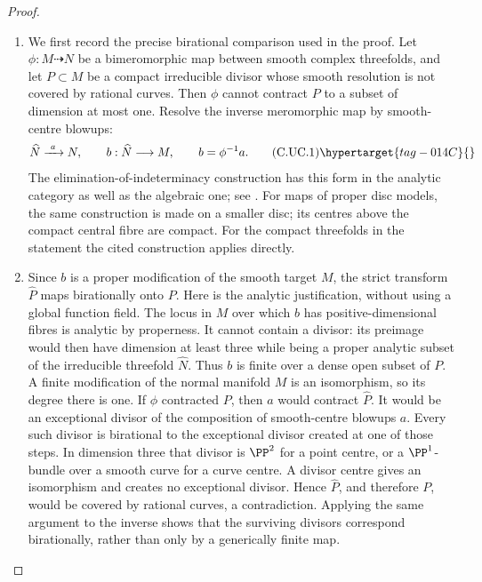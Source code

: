 \begin{proof}

\begin{enumerate}[label={$\langle1\rangle$\arabic*.},leftmargin=*]
\item We first record the precise birational comparison
used in the proof. Let $\phi:M\dashrightarrow N$
be a bimeromorphic map between smooth complex
threefolds, and let $P\subset M$ be a compact
irreducible divisor whose smooth resolution is
not covered by rational curves. Then $\phi$
cannot contract $P$ to a subset of dimension
at most one. Resolve the inverse meromorphic
map by smooth-centre blowups:
\[
 \widehat N\xrightarrow{\ a\ }N,
 \qquad b:\widehat N\longrightarrow M,
 \qquad b=\phi^{-1}a.
\tag{C.UC.1}\hypertarget{tag-014C}{}\label{cdp:eq:C.UC.1}
\]
The elimination-of-indeterminacy construction
has this form in the analytic category as
well as the algebraic one; see
\cite[Section~1.2.4 and Lemma~1.3.1]{AKMW2002}.
For maps of proper disc models, the same
construction is made on a smaller disc; its
centres above the compact central fibre are
compact. For the compact threefolds in the
statement the cited construction applies
directly.

\item Since $b$ is a proper modification of the
smooth target $M$, the strict transform
$\widehat P$ maps birationally onto $P$.
Here is the analytic justification, without
using a global function field. The locus in
$M$ over which $b$ has positive-dimensional
fibres is analytic by properness. It cannot
contain a divisor: its preimage would then
have dimension at least three while being
a proper analytic subset of the irreducible
threefold $\widehat N$. Thus $b$ is finite
over a dense open subset of $P$. A finite
modification of the normal manifold $M$
is an isomorphism, so its degree there is
one. If $\phi$ contracted
$P$, then $a$ would contract $\widehat P$.
It would be an exceptional divisor of the
composition of smooth-centre blowups $a$.
Every such divisor is birational to the
exceptional divisor created at one of those
steps. In dimension three that divisor is
$\PP^2$ for a point centre, or a
$\PP^1$-bundle over a smooth curve for a
curve centre. A divisor centre gives an
isomorphism and creates no exceptional
divisor. Hence $\widehat P$, and therefore
$P$, would be covered by rational curves,
a contradiction. Applying the same argument
to the inverse shows that the surviving
divisors correspond birationally, rather
than only by a generically finite map.


\end{enumerate}
\end{proof}
